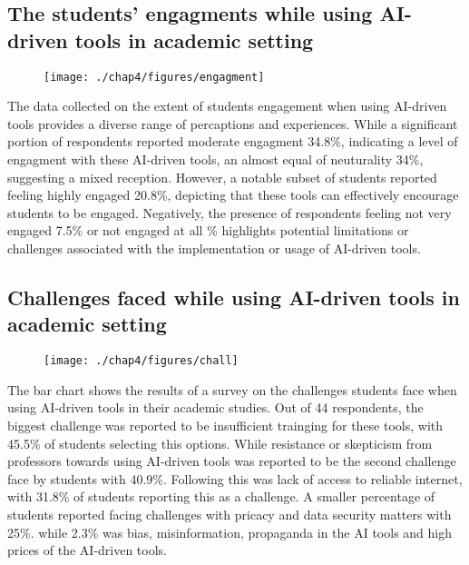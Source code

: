 \subsection{The students' engagments while using AI-driven tools in academic setting}

\begin{figure}[H]
	\centering
	\texttt{[image: ./chap4/figures/engagment]}
\end{figure}

The data collected on the extent of students engagement when using AI-driven tools
provides a diverse range of percaptions and experiences. While a significant portion
of respondents reported moderate engagment 34.8\%, indicating a level of engagment with
these AI-driven tools, an almost equal of neuturality 34\%, suggesting a mixed reception.
However, a notable subset of students reported feeling highly engaged 20.8\%, depicting that
these tools can effectively encourage students to be engaged. Negatively, the presence
of respondents feeling not very engaged 7.5\% or not engaged at all \% highlights potential
limitations or challenges associated with the implementation or usage of AI-driven tools.


\subsection{Challenges faced while using AI-driven tools in academic setting}

\begin{figure}[H]
	\centering
	\texttt{[image: ./chap4/figures/chall]}
\end{figure}

The bar chart shows the results of a survey on the challenges students
face when using AI-driven tools in their academic studies. Out of 44 respondents,
the biggest challenge was reported to be insufficient trainging for these
tools, with 45.5\% of students selecting this options. While resistance or skepticism
from professors towards using AI-driven tools was reported to be the second challenge
face by students with 40.9\%.
Following this was lack of access to reliable internet, with 31.8\% of students
reporting this as a challenge.
A smaller percentage of students reported facing challenges with pricacy and data security matters
with 25\%. while 2.3\% was bias, misinformation, propaganda in the AI tools and high prices of the AI-driven tools.

